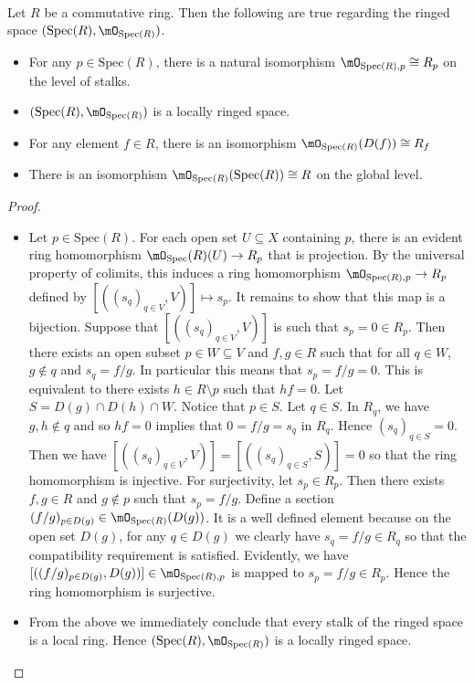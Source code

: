 \documentclass[a4paper]{article}
\begin{document}
\begin{prp}{}{}\\
Let $R$ be a commutative ring. Then the following are true regarding the ringed space $(\text{Spec}(R),\mO_{\text{Spec}(R)})$. 
\begin{itemize}
\item For any $p\in\text{Spec}(R)$, there is a natural isomorphism $\mO_{\text{Spec}(R),p}\cong R_p$ on the level of stalks. 
\item $(\text{Spec}(R),\mO_{\text{Spec}(R)})$ is a locally ringed space. 
\item For any element $f\in R$, there is an isomorphism $\mO_{\text{Spec}(R)}(D(f))\cong R_f$
\item There is an isomorphism $\mO_{\text{Spec}(R)}(\text{Spec}(R))\cong R$ on the global level. 
\end{itemize} 
\begin{proof}
\begin{itemize}
\item Let $p\in\text{Spec}(R)$. For each open set $U\subseteq X$ containing $p$, there is an evident ring homomorphism $\mO_\text{Spec}(R)(U)\to R_p$ that is projection. By the universal property of colimits, this induces a ring homomorphism $\mO_{\text{Spec}(R),p}\to R_p$ defined by $[((s_q)_{q\in V},V)]\mapsto s_p$. It remains to show that this map is a bijection. Suppose that $[((s_q)_{q\in V},V)]$ is such that $s_p=0\in R_p$. Then there exists an open subset $p\in W\subseteq V$ and $f,g\in R$ such that for all $q\in W$, $g\notin q$ and $s_q=f/g$. In particular this means that $s_p=f/g=0$. This is equivalent to there exists $h\in R\setminus p$ such that $hf=0$. Let $S=D(g)\cap D(h)\cap W$. Notice that $p\in S$. Let $q\in S$. In $R_q$, we have $g,h\notin q$ and so $hf=0$ implies that $0=f/g=s_q$ in $R_q$. Hence $(s_q)_{q\in S}=0$. Then we have $[((s_q)_{q\in V},V)]=[((s_q)_{q\in S},S)]=0$ so that the ring homomorphism is injective. For surjectivity, let $s_p\in R_p$. Then there exists $f,g\in R$ and $g\notin p$ such that $s_p=f/g$. Define a section $(f/g)_{p\in D(g)}\in\mO_{\text{Spec}(R)}(D(g))$. It is a well defined element because on the open set $D(g)$, for any $q\in D(g)$ we clearly have $s_q=f/g\in R_q$ so that the compatibility requirement is satisfied. Evidently, we have $[((f/g)_{p\in D(g)},D(g))]\in\mO_{\text{Spec}(R),p}$ is mapped to $s_p=f/g\in R_p$. Hence the ring homomorphism is surjective. 

\item From the above we immediately conclude that every stalk of the ringed space is a local ring. Hence $(\text{Spec}(R),\mO_{\text{Spec}(R)})$ is a locally ringed space. 


\end{itemize}
\end{proof}
\end{prp}
\end{document}

